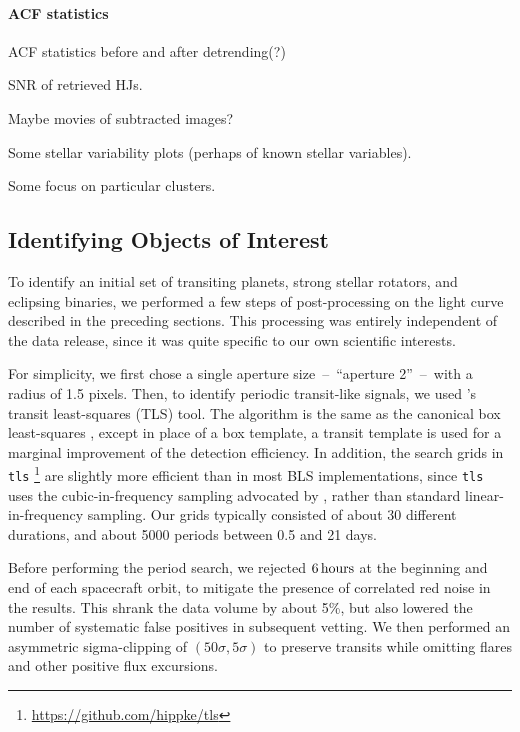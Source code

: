 \documentclass[12pt,twocolumn,tighten]{aastex62}
\begin{document}
\paragraph{ACF statistics}
ACF statistics before and after detrending(?)

SNR of retrieved HJs.

Maybe movies of subtracted images?

Some stellar variability plots (perhaps of known stellar variables).

Some focus on particular clusters.

\subsection{Identifying Objects of Interest}
\label{subsec:identifying_ctois}

To identify an initial set of transiting planets, strong stellar rotators, and 
eclipsing binaries, we performed a few steps of post-processing on the light 
curve described in the preceding sections. 
This processing was entirely independent of the data release, since it was 
quite specific to our own scientific interests.

For simplicity,
we first chose a single aperture size~--~``aperture 2''~--~with a radius of 
1.5  pixels.
Then, to identify periodic transit-like signals, we used 
\citet{hippke_TLS_2019}'s transit least-squares (TLS) tool.
The algorithm is the same as the canonical box least-squares
\citep{kovacs_box-fitting_2002}, except in place of a box template, a transit 
template is used  for a marginal improvement of the detection efficiency.
In addition, the search grids in \texttt{tls} 
\footnote{\url{https://github.com/hippke/tls}} are slightly more 
efficient than in most BLS implementations, since \texttt{tls} uses the 
cubic-in-frequency sampling advocated by \citet{ofir_optimizing_2014}, 
rather than standard linear-in-frequency sampling.
Our grids typically consisted of about 30 different durations, and
about 5000 periods between 0.5 and 21 days. 

Before performing the period search, we rejected $6\,{\rm hours}$ at the
beginning and end of each spacecraft orbit, to mitigate the presence
of correlated red noise in the results.
This shrank the data volume by about 5\%, but also lowered the number
of systematic false positives in subsequent vetting.
We then performed an asymmetric sigma-clipping of $(50\sigma,5\sigma)$ to 
preserve transits while omitting flares and other positive flux excursions. 
\end{document}
